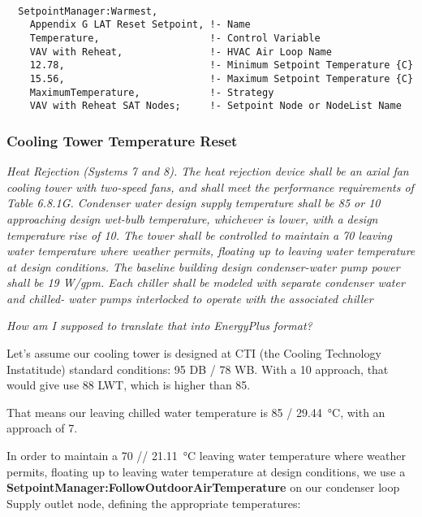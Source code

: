 \begin{lstlisting}

  SetpointManager:Warmest,
    Appendix G LAT Reset Setpoint, !- Name
    Temperature,                   !- Control Variable
    VAV with Reheat,               !- HVAC Air Loop Name
    12.78,                         !- Minimum Setpoint Temperature {C}
    15.56,                         !- Maximum Setpoint Temperature {C}
    MaximumTemperature,            !- Strategy
    VAV with Reheat SAT Nodes;     !- Setpoint Node or NodeList Name

\end{lstlisting}


\subsubsection{Cooling Tower Temperature Reset}%
\label{ssub:cooling_tower_temperature_reset}

\emph{Heat Rejection (Systems 7 and 8). The heat
rejection device shall be an axial fan cooling tower with two-speed fans, and shall meet the performance requirements of
Table 6.8.1G. Condenser water design supply temperature shall
be \SI{85}{\farenheit} or \SI{10}{\farenheit} approaching design wet-bulb temperature,
whichever is lower, with a design temperature rise of \SI{10}{\farenheit}. The
tower shall be controlled to maintain a \SI{70}{\farenheit} leaving water
temperature where weather permits, floating up to leaving water
temperature at design conditions. The baseline building design
condenser-water pump power shall be 19 W/gpm. Each chiller
shall be modeled with separate condenser water and chilled-
water pumps interlocked to operate with the associated chiller}

\emph{How am I supposed to translate that into EnergyPlus format?}

Let's assume our cooling tower is designed at CTI (the Cooling Technology Instatitude) standard conditions: \SI{95}{\farenheit} DB / \SI{78}{\farenheit} WB.
With a \SI{10}{\farenheit} approach, that would give use \SI{88}{\farenheit} LWT, which is higher than \SI{85}{\farenheit}.

That means our leaving chilled water temperature is \SI{85}{\farenheit} / \SI{29.44}{\celsius}, with an approach of \SI{7}{\farenheit}.

In order to   maintain a \SI{70}{\farenheit} // \SI{21.11}{\celsius} leaving water temperature where weather permits, floating up to leaving water
temperature at design conditions, we use a \textbf{SetpointManager:FollowOutdoorAirTemperature} on our condenser loop Supply outlet node, defining the appropriate temperatures:

